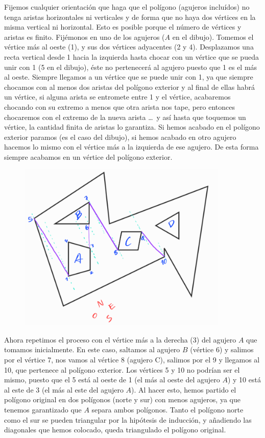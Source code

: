 \documentclass{amsart}
\begin{document}
Fijemos cualquier orientación que haga que el polígono (agujeros incluídos) no tenga aristas horizontales ni verticales y de forma que no haya dos vértices en la misma vertical ni horizontal. Esto es posible porque el número de vértices y aristas es finito. Fijémonos en uno de los agujeros ($A$ en el dibujo). Tomemos el vértice más al oeste (1), y sus dos vértices adyacentes (2 y 4). Desplazamos una recta vertical desde 1 hacia la izquierda hasta chocar con un vértice que se pueda unir con 1 (5 en el dibujo), éste no pertenecerá al agujero puesto que 1 es el más al oeste. Siempre llegamos a un vértice que se puede unir con 1, ya que siempre chocamos con al menos dos aristas del polígono exterior y al final de ellas habrá un vértice, si alguna arista se entromete entre 1 y el vértice, acabaremos chocando con su extremo a menos que otra arista nos tape, pero entonces chocaremos con el extremo de la nueva arista \ldots \ y así hasta que toquemos un vértice, la cantidad finita de aristas lo garantiza. Si hemos acabado en el polígono exterior paramos (es el caso del dibujo), si hemos acabado en otro agujero hacemos lo mismo con el vértice más a la izquierda de ese agujero. De esta forma siempre acabamos en un vértice del polígono exterior.

\begin{figure}[H]
	\includegraphics[width=100mm]{imgs/triang-agujeros}
\end{figure}

Ahora repetimos el proceso con el vértice más a la derecha (3) del agujero $A$ que tomamos inicialmente. En este caso, saltamos al agujero $B$ (vértice 6) y salimos por el vértice 7, nos vamos al vértice 8 (agujero C), salimos por el 9 y llegamos al 10, que pertenece al polígono exterior. Los vértices 5 y 10 no podrían ser el mismo, puesto que el 5 está al oeste de 1 (el más al oeste del agujero $A$) y 10 está al este de 3 (el más al este del agujero $A$). Al hacer esto, hemos partido el polígono original en dos polígonos (norte y sur) con menos agujeros, ya que tenemos garantizado que $A$ separa ambos polígonos. Tanto el polígono norte como el sur se pueden triangular por la hipótesis de inducción, y añadiendo las diagonales que hemos colocado, queda triangulado el polígono original.
\end{document}
